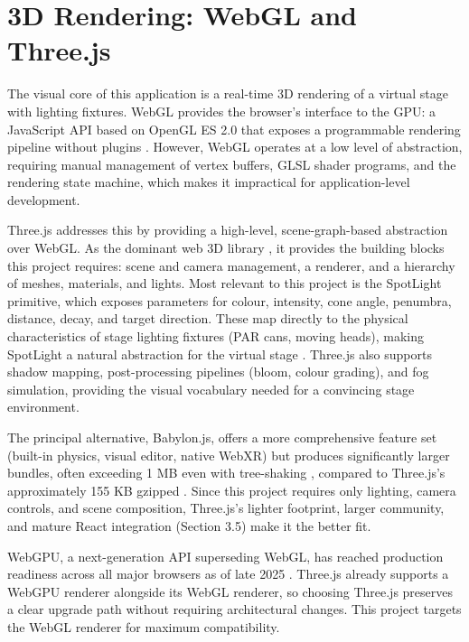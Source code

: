 \section{3D Rendering: WebGL and Three.js}

The visual core of this application is a real-time 3D rendering of a virtual stage with lighting fixtures. WebGL provides the browser's interface to the GPU: a JavaScript API based on OpenGL ES 2.0 that exposes a programmable rendering pipeline without plugins \cite{threejs-docs}. However, WebGL operates at a low level of abstraction, requiring manual management of vertex buffers, GLSL shader programs, and the rendering state machine, which makes it impractical for application-level development.

Three.js addresses this by providing a high-level, scene-graph-based abstraction over WebGL. As the dominant web 3D library \cite{threejs-github,npm-three}, it provides the building blocks this project requires: scene and camera management, a renderer, and a hierarchy of meshes, materials, and lights. Most relevant to this project is the SpotLight primitive, which exposes parameters for colour, intensity, cone angle, penumbra, distance, decay, and target direction. These map directly to the physical characteristics of stage lighting fixtures (PAR cans, moving heads), making SpotLight a natural abstraction for the virtual stage \cite{threejs-docs}. Three.js also supports shadow mapping, post-processing pipelines (bloom, colour grading), and fog simulation, providing the visual vocabulary needed for a convincing stage environment.

The principal alternative, Babylon.js, offers a more comprehensive feature set (built-in physics, visual editor, native WebXR) but produces significantly larger bundles, often exceeding 1 MB even with tree-shaking \cite{babylonjs-forum-bundle-size}, compared to Three.js's approximately 155 KB gzipped \cite{bundlephobia-three}. Since this project requires only lighting, camera controls, and scene composition, Three.js's lighter footprint, larger community, and mature React integration (Section 3.5) make it the better fit.

WebGPU, a next-generation API superseding WebGL, has reached production readiness across all major browsers as of late 2025 \cite{webdev-webgpu-major-browsers-2025,gpuweb-implementation-status}. Three.js already supports a WebGPU renderer alongside its WebGL renderer, so choosing Three.js preserves a clear upgrade path without requiring architectural changes. This project targets the WebGL renderer for maximum compatibility.

